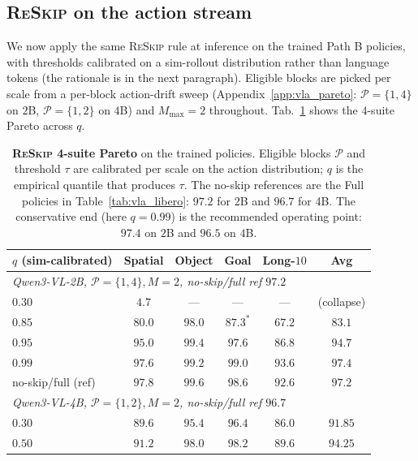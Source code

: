 \documentclass{article}
\newcommand{\reskip}{\textsc{ReSkip}}
\begin{document}
\subsection{\reskip{} on the action stream}
\label{sec:vla_reskip}

We now apply the same \reskip{} rule at inference on the trained Path B policies, with thresholds calibrated on a sim-rollout distribution rather than language tokens (the rationale is in the next paragraph). Eligible blocks are picked per scale from a per-block action-drift sweep (Appendix~\ref{app:vla_pareto}: $\mathcal{P}{=}\{1,4\}$ on $2$B, $\mathcal{P}{=}\{1,2\}$ on $4$B) and $M_{\max}{=}2$ throughout. Tab.~\ref{tab:vla_reskip_pareto} shows the $4$-suite Pareto across $q$.

\begin{table}[t]
\caption{\textbf{\reskip{} 4-suite Pareto} on the trained policies. Eligible blocks $\mathcal{P}$ and threshold $\tau$ are calibrated per scale on the action distribution; $q$ is the empirical quantile that produces $\tau$. The no-skip references are the Full policies in Table~\ref{tab:vla_libero}: $97.2$ for 2B and $96.7$ for 4B. The conservative end (here $q{=}0.99$) is the recommended operating point: $97.4$ on $2$B and $96.5$ on $4$B.}
\label{tab:vla_reskip_pareto}
\centering\small
\setlength{\tabcolsep}{4pt}
\begin{tabular}{lccccc}
\toprule
$q$ (sim-calibrated) & Spatial & Object & Goal & Long-$10$ & \textbf{Avg} \\
\midrule
\multicolumn{6}{l}{\emph{Qwen3-VL-2B, $\mathcal{P}{=}\{1,4\}, M{=}2$, no-skip/full ref $97.2$}} \\
\midrule
$0.30$              & $4.7$  & ---     & ---     & ---     & (collapse) \\
$0.85$              & $80.0$ & $98.0$  & $87.3^\ast$ & $67.2$  & $83.1$ \\
$0.95$              & $95.0$ & $99.4$  & $97.6$  & $86.8$  & $94.7$ \\
$\mathbf{0.99}$     & $\mathbf{97.6}$ & $\mathbf{99.2}$  & $\mathbf{99.0}$  & $\mathbf{93.6}$  & $\mathbf{97.4}$ \\
no-skip/full (ref)  & $97.8$ & $99.6$  & $98.6$  & $92.6$  & $97.2$ \\
\midrule
\multicolumn{6}{l}{\emph{Qwen3-VL-4B, $\mathcal{P}{=}\{1,2\}, M{=}2$, no-skip/full ref $96.7$}} \\
\midrule
$0.30$              & $89.6$ & $95.4$  & $96.4$  & $86.0$  & $91.85$ \\
$0.50$              & $91.2$ & $98.0$  & $98.2$  & $89.6$  & $94.25$ \\

\end{tabular}
\end{table}
\end{document}
